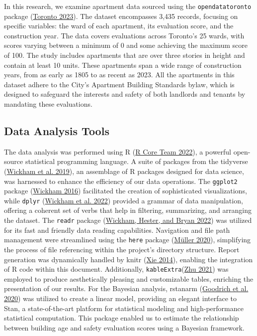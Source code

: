 \documentclass[
  letterpaper,
  DIV=11,
  numbers=noendperiod]{scrartcl}
\begin{document}
In this research, we examine apartment data sourced using the
\texttt{opendatatoronto} package
(\protect\hyperlink{ref-Toronto_2023}{Toronto 2023}). The dataset
encompasses 3,435 records, focusing on specific variables: the ward of
each apartment, its evaluation score, and the construction year. The
data covers evaluations across Toronto's 25 wards, with scores varying
between a minimum of 0 and some achieving the maximum score of 100. The
study includes apartments that are over three stories in height and
contain at least 10 units. These apartments span a wide range of
construction years, from as early as 1805 to as recent as 2023. All the
apartments in this dataset adhere to the City's Apartment Building
Standards bylaw, which is designed to safeguard the interests and safety
of both landlords and tenants by mandating these evaluations.

\hypertarget{data-analysis-tools}{%
\subsection{Data Analysis Tools}\label{data-analysis-tools}}

The data analysis was performed using R (\protect\hyperlink{ref-r}{R
Core Team 2022}), a powerful open-source statistical programming
language. A suite of packages from the tidyverse
(\protect\hyperlink{ref-rTidyverse}{Wickham et al. 2019}), an assemblage
of R packages designed for data science, was harnessed to enhance the
efficiency of our data operations. The \texttt{ggplot2} package
(\protect\hyperlink{ref-rGgplot2}{Wickham 2016}) facilitated the
creation of sophisticated visualizations, while \texttt{dplyr}
(\protect\hyperlink{ref-rDplyr}{Wickham et al. 2022}) provided a grammar
of data manipulation, offering a coherent set of verbs that help in
filtering, summarizing, and arranging the dataset. The \texttt{readr}
package (\protect\hyperlink{ref-rReadr}{Wickham, Hester, and Bryan
2022}) was utilized for its fast and friendly data reading capabilities.
Navigation and file path management were streamlined using the
\texttt{here} package (\protect\hyperlink{ref-R-here}{Müller 2020}),
simplifying the process of file referencing within the project's
directory structure. Report generation was dynamically handled by knitr
(\protect\hyperlink{ref-rKnitr}{Xie 2014}), enabling the integration of
R code within this document. Additionally,
\texttt{kableExtra}(\protect\hyperlink{ref-R-kableExtra}{Zhu 2021}) was
employed to produce aesthetically pleasing and customizable tables,
enriching the presentation of our results. For the Bayesian analysis,
rstanarm (\protect\hyperlink{ref-R-rstanarm}{Goodrich et al. 2020}) was
utilized to create a linear model, providing an elegant interface to
Stan, a state-of-the-art platform for statistical modeling and
high-performance statistical computation. This package enabled us to
estimate the relationship between building age and safety evaluation
scores using a Bayesian framework.
\end{document}
